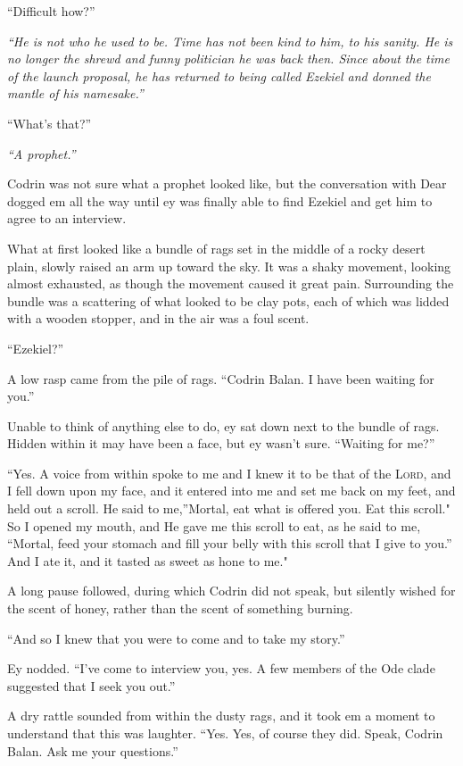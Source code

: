 ``Difficult how?''

\emph{``He is not who he used to be. Time has not been kind to him, to his sanity. He is no longer the shrewd and funny politician he was back then. Since about the time of the launch proposal, he has returned to being called Ezekiel and donned the mantle of his namesake.''}

``What's that?''

\emph{``A prophet.''}

Codrin was not sure what a prophet looked like, but the conversation with Dear dogged em all the way until ey was finally able to find Ezekiel and get him to agree to an interview.

What at first looked like a bundle of rags set in the middle of a rocky desert plain, slowly raised an arm up toward the sky. It was a shaky movement, looking almost exhausted, as though the movement caused it great pain. Surrounding the bundle was a scattering of what looked to be clay pots, each of which was lidded with a wooden stopper, and in the air was a foul scent.

``Ezekiel?''

A low rasp came from the pile of rags. ``Codrin Balan. I have been waiting for you.''

Unable to think of anything else to do, ey sat down next to the bundle of rags. Hidden within it may have been a face, but ey wasn't sure. ``Waiting for me?''

``Yes. A voice from within spoke to me and I knew it to be that of the \textsc{Lord}, and I fell down upon my face, and it entered into me and set me back on my feet, and held out a scroll. He said to me,''Mortal, eat what is offered you. Eat this scroll." So I opened my mouth, and He gave me this scroll to eat, as he said to me, ``Mortal, feed your stomach and fill your belly with this scroll that I give to you.'' And I ate it, and it tasted as sweet as hone to me."

A long pause followed, during which Codrin did not speak, but silently wished for the scent of honey, rather than the scent of something burning.

``And so I knew that you were to come and to take my story.''

Ey nodded. ``I've come to interview you, yes. A few members of the Ode clade suggested that I seek you out.''

A dry rattle sounded from within the dusty rags, and it took em a moment to understand that this was laughter. ``Yes. Yes, of course they did. Speak, Codrin Balan. Ask me your questions.''

